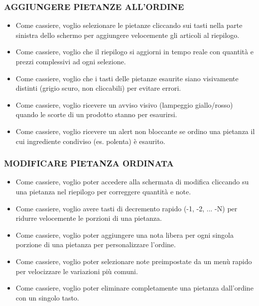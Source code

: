 \subsubsection*{AGGIUNGERE PIETANZE ALL'ORDINE}
\begin{itemize}
    \item Come cassiere, voglio selezionare le pietanze cliccando sui tasti nella parte sinistra dello schermo per aggiungere velocemente gli articoli al riepilogo.
    \item Come cassiere, voglio che il riepilogo si aggiorni in tempo reale con quantità e prezzi complessivi ad ogni selezione.
    \item Come cassiere, voglio che i tasti delle pietanze esaurite siano visivamente distinti (grigio scuro, non cliccabili) per evitare errori.
    \item Come cassiere, voglio ricevere un avviso visivo (lampeggio giallo/rosso) quando le scorte di un prodotto stanno per esaurirsi.
    \item Come cassiere, voglio ricevere un alert non bloccante se ordino una pietanza il cui ingrediente condiviso (es. polenta) è esaurito.
\end{itemize}

\subsubsection*{MODIFICARE PIETANZA ORDINATA}
\begin{itemize}
    \item Come cassiere, voglio poter accedere alla schermata di modifica cliccando su una pietanza nel riepilogo per correggere quantità e note.
    \item Come cassiere, voglio avere tasti di decremento rapido (-1, -2, ... -N) per ridurre velocemente le porzioni di una pietanza.
    \item Come cassiere, voglio poter aggiungere una nota libera per ogni singola porzione di una pietanza per personalizzare l'ordine.
    \item Come cassiere, voglio poter selezionare note preimpostate da un menù rapido per velocizzare le variazioni più comuni.
    \item Come cassiere, voglio poter eliminare completamente una pietanza dall'ordine con un singolo tasto.
\end{itemize}

